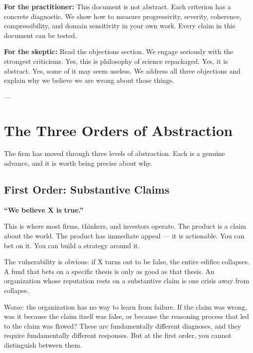 \documentclass[11pt,letterpaper]{article}
\begin{document}
\textbf{For the practitioner:} This document is not abstract. Each criterion has a concrete diagnostic. We show how to measure progressivity, severity, coherence, compressibility, and domain sensitivity in your own work. Every claim in this document can be tested.

\textbf{For the skeptic:} Read the objections section. We engage seriously with the strongest criticisms. Yes, this is philosophy of science repackaged. Yes, it is abstract. Yes, some of it may seem useless. We address all three objections and explain why we believe we are wrong about those things.

---

\newpage

\tableofcontents

\newpage


\section{The Three Orders of Abstraction}

The firm has moved through three levels of abstraction. Each is a genuine advance, and it is worth being precise about why.

\subsection*{First Order: Substantive Claims}

\noindent \textbf{``We believe X is true.''}

This is where most firms, thinkers, and investors operate. The product is a claim about the world. The product has immediate appeal — it is actionable. You can bet on it. You can build a strategy around it.

The vulnerability is obvious: if X turns out to be false, the entire edifice collapses. A fund that bets on a specific thesis is only as good as that thesis. An organization whose reputation rests on a substantive claim is one crisis away from collapse.

Worse: the organization has no way to learn from failure. If the claim was wrong, was it because the claim itself was false, or because the reasoning process that led to the claim was flawed? These are fundamentally different diagnoses, and they require fundamentally different responses. But at the first order, you cannot distinguish between them.
\end{document}
